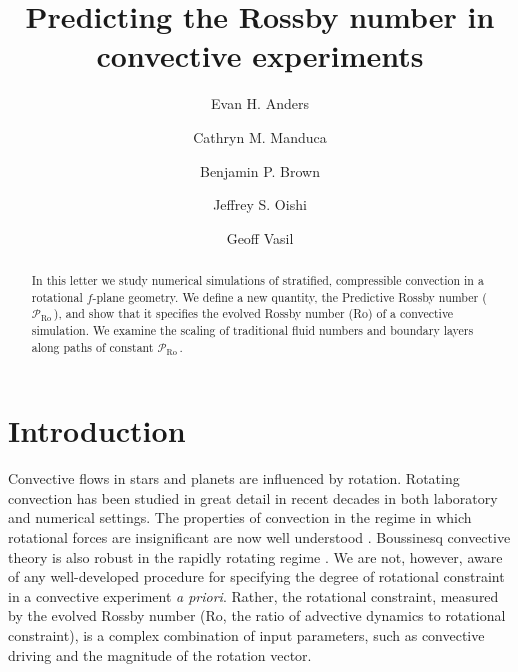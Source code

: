 \documentclass[twocolumn, amsmath, amsfonts, amssymb]{aastex62}
\newcommand{\pro}{\ensuremath{\mathcal{P}_{\text{Ro}}\,}}
\begin{document}
\newcommand{\AB}{\citetalias{anders&brown2017}}

\title{Predicting the Rossby number in convective experiments}


\author{Evan H. Anders}
\author{Cathryn M. Manduca}
\author{Benjamin P. Brown}
\author{Jeffrey S. Oishi}
\author{Geoff Vasil}


\begin{abstract}
In this letter we study numerical simulations of stratified, compressible convection in a
rotational $f$-plane geometry. We define a new quantity, the Predictive Rossby number
(\pro), and show that it specifies the evolved Rossby number (Ro) of a convective simulation.
We examine the scaling of traditional fluid numbers and boundary layers along paths of constant
\pro.
\end{abstract}


\section{Introduction}
\label{sec:intro}
Convective flows in stars and planets are influenced by rotation. 
Rotating convection has been studied in great detail in
recent decades in both laboratory and numerical settings. The
properties of convection in the regime in which rotational forces are
insignificant are now well understood \citep{king&all2009, zhong&all2009, 
cheng&all2015}. Boussinesq convective theory is also robust
in the rapidly rotating regime \citep{julien&all2012, stellmach&all2014,
gastine&all2016}. We are not, however, aware of any well-developed
procedure for specifying the degree of rotational constraint
in a convective experiment \emph{a priori}. Rather, the rotational
constraint, measured by the evolved Rossby number
(Ro, the ratio of advective dynamics to rotational constraint), is a complex
combination of input parameters, such as convective driving and the
magnitude of the rotation vector.
\end{document}
